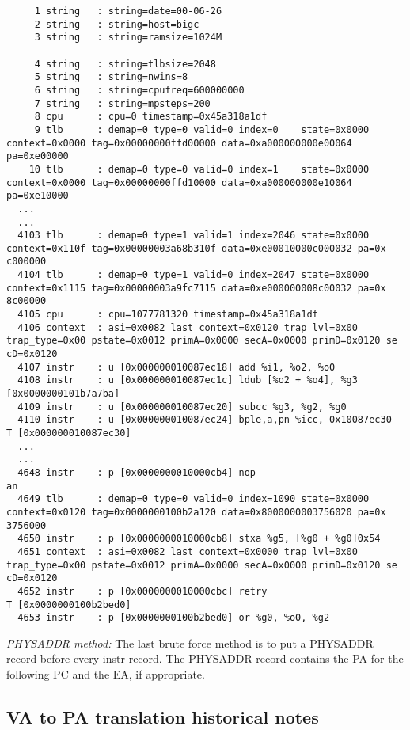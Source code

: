 \documentclass[10pt]{article}
\begin{document}
{\footnotesize
\begin{verbatim}
     1 string   : string=date=00-06-26
     2 string   : string=host=bigc
     3 string   : string=ramsize=1024M

     4 string   : string=tlbsize=2048
     5 string   : string=nwins=8
     6 string   : string=cpufreq=600000000
     7 string   : string=mpsteps=200
     8 cpu      : cpu=0 timestamp=0x45a318a1df
     9 tlb      : demap=0 type=0 valid=0 index=0    state=0x0000 context=0x0000 tag=0x00000000ffd00000 data=0xa000000000e00064 pa=0xe00000
    10 tlb      : demap=0 type=0 valid=0 index=1    state=0x0000 context=0x0000 tag=0x00000000ffd10000 data=0xa000000000e10064 pa=0xe10000
  ...
  ... 
  4103 tlb      : demap=0 type=1 valid=1 index=2046 state=0x0000 context=0x110f tag=0x00000003a68b310f data=0xe00010000c000032 pa=0x
c000000
  4104 tlb      : demap=0 type=1 valid=0 index=2047 state=0x0000 context=0x1115 tag=0x00000003a9fc7115 data=0xe000000008c00032 pa=0x
8c00000
  4105 cpu      : cpu=1077781320 timestamp=0x45a318a1df
  4106 context  : asi=0x0082 last_context=0x0120 trap_lvl=0x00 trap_type=0x00 pstate=0x0012 primA=0x0000 secA=0x0000 primD=0x0120 se
cD=0x0120
  4107 instr    : u [0x000000010087ec18] add %i1, %o2, %o0                 
  4108 instr    : u [0x000000010087ec1c] ldub [%o2 + %o4], %g3             [0x0000000101b7a7ba] 
  4109 instr    : u [0x000000010087ec20] subcc %g3, %g2, %g0               
  4110 instr    : u [0x000000010087ec24] bple,a,pn %icc, 0x10087ec30     T [0x000000010087ec30]
  ...
  ...
  4648 instr    : p [0x0000000010000cb4] nop                               an 
  4649 tlb      : demap=0 type=0 valid=0 index=1090 state=0x0000 context=0x0120 tag=0x0000000100b2a120 data=0x8000000003756020 pa=0x
3756000
  4650 instr    : p [0x0000000010000cb8] stxa %g5, [%g0 + %g0]0x54         
  4651 context  : asi=0x0082 last_context=0x0000 trap_lvl=0x00 trap_type=0x00 pstate=0x0012 primA=0x0000 secA=0x0000 primD=0x0120 se
cD=0x0120
  4652 instr    : p [0x0000000010000cbc] retry                           T [0x0000000100b2bed0] 
  4653 instr    : p [0x0000000100b2bed0] or %g0, %o0, %g2                  
\end{verbatim}
}

\textsl{PHYSADDR method:} The last brute force method is to put a
PHYSADDR record before every instr record.  The PHYSADDR record contains
the PA for the following PC and the EA, if appropriate.

\subsection{VA to PA translation historical notes}
\end{document}
